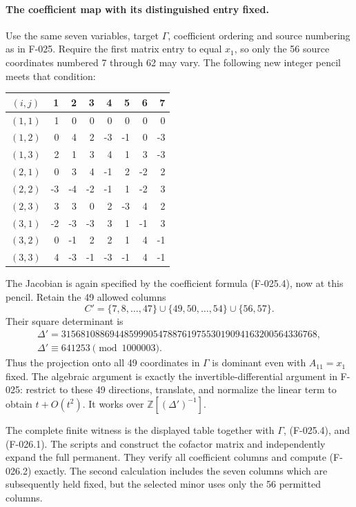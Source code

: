\paragraph{The coefficient map with its distinguished entry fixed.}
Use the same seven variables, target \(\Gamma\),
coefficient ordering and source numbering as in F-025.
Require the first matrix entry to equal \(x_1\), so
only the 56 source coordinates numbered 7 through 62
may vary. The following new integer pencil meets that
condition:
\begin{center}
\begin{tabular}{@{}c|rrrrrrr@{}}
\toprule
\((i,j)\)&1&2&3&4&5&6&7\\\midrule
\((1,1)\)&1&0&0&0&0&0&0\\
\((1,2)\)&0&4&2&-3&-1&0&-3\\
\((1,3)\)&2&1&3&4&1&3&-3\\
\((2,1)\)&0&3&4&-1&2&-2&2\\
\((2,2)\)&-3&-4&-2&-1&1&-2&3\\
\((2,3)\)&3&3&0&2&-3&4&2\\
\((3,1)\)&-2&-3&-3&3&1&-1&3\\
\((3,2)\)&0&-1&2&2&1&4&-1\\
\((3,3)\)&4&-3&-1&-3&-1&4&-1\\\bottomrule
\end{tabular}
\end{center}
The Jacobian is again specified by the coefficient formula
(F-025.4), now at this pencil. Retain the 49 allowed columns
\[
                 C'=\{7,8,\ldots,47\}
                        \cup\{49,50,\ldots,54\}\cup\{56,57\}.
                                                               \tag{F-026.1}
\]
Their square determinant is
\[
 \begin{gathered}
       \Delta'=31568108869448599905478876197553019094163200564336768,
          \\
          \Delta'\equiv641253\pmod{1000003}.
 \end{gathered}                                      \tag{F-026.2}
\]
Thus the projection onto all 49 coordinates in \(\Gamma\)
is dominant even with \(A_{11}=x_1\) fixed.
The algebraic argument is exactly the invertible-differential
argument in F-025: restrict to these 49 directions, translate,
and normalize the linear term to obtain \(t+O(t^2)\).
It works over \(\mathbb Z[(\Delta')^{-1}]\).

The complete finite witness is the displayed table together
with \(\Gamma\), (F-025.4), and (F-026.1).
The scripts
and
construct the cofactor matrix and independently expand the
full permanent. They verify all coefficient columns and
compute (F-026.2) exactly. The second calculation includes
the seven columns which are subsequently held fixed, but
the selected minor uses only the 56 permitted columns.


